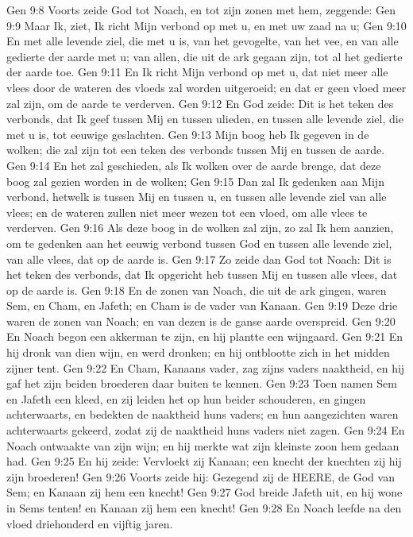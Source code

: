 Gen 9:8  Voorts zeide God tot Noach, en tot zijn zonen met hem, zeggende:
Gen 9:9  Maar Ik, ziet, Ik richt Mijn verbond op met u, en met uw zaad na u;
Gen 9:10  En met alle levende ziel, die met u is, van het gevogelte, van het vee, en van alle gedierte der aarde met u; van allen, die uit de ark gegaan zijn, tot al het gedierte der aarde toe.
Gen 9:11  En Ik richt Mijn verbond op met u, dat niet meer alle vlees door de wateren des vloeds zal worden uitgeroeid; en dat er geen vloed meer zal zijn, om de aarde te verderven.
Gen 9:12  En God zeide: Dit is het teken des verbonds, dat Ik geef tussen Mij en tussen ulieden, en tussen alle levende ziel, die met u is, tot eeuwige geslachten.
Gen 9:13  Mijn boog heb Ik gegeven in de wolken; die zal zijn tot een teken des verbonds tussen Mij en tussen de aarde.
Gen 9:14  En het zal geschieden, als Ik wolken over de aarde brenge, dat deze boog zal gezien worden in de wolken;
Gen 9:15  Dan zal Ik gedenken aan Mijn verbond, hetwelk is tussen Mij en tussen u, en tussen alle levende ziel van alle vlees; en de wateren zullen niet meer wezen tot een vloed, om alle vlees te verderven.
Gen 9:16  Als deze boog in de wolken zal zijn, zo zal Ik hem aanzien, om te gedenken aan het eeuwig verbond tussen God en tussen alle levende ziel, van alle vlees, dat op de aarde is.
Gen 9:17  Zo zeide dan God tot Noach: Dit is het teken des verbonds, dat Ik opgericht heb tussen Mij en tussen alle vlees, dat op de aarde is.
Gen 9:18  En de zonen van Noach, die uit de ark gingen, waren Sem, en Cham, en Jafeth; en Cham is de vader van Kanaan.
Gen 9:19  Deze drie waren de zonen van Noach; en van dezen is de ganse aarde overspreid.
Gen 9:20  En Noach begon een akkerman te zijn, en hij plantte een wijngaard.
Gen 9:21  En hij dronk van dien wijn, en werd dronken; en hij ontblootte zich in het midden zijner tent.
Gen 9:22  En Cham, Kanaans vader, zag zijns vaders naaktheid, en hij gaf het zijn beiden broederen daar buiten te kennen.
Gen 9:23  Toen namen Sem en Jafeth een kleed, en zij leiden het op hun beider schouderen, en gingen achterwaarts, en bedekten de naaktheid huns vaders; en hun aangezichten waren achterwaarts gekeerd, zodat zij de naaktheid huns vaders niet zagen.
Gen 9:24  En Noach ontwaakte van zijn wijn; en hij merkte wat zijn kleinste zoon hem gedaan had.
Gen 9:25  En hij zeide: Vervloekt zij Kanaan; een knecht der knechten zij hij zijn broederen!
Gen 9:26  Voorts zeide hij: Gezegend zij de HEERE, de God van Sem; en Kanaan zij hem een knecht!
Gen 9:27  God breide Jafeth uit, en hij wone in Sems tenten! en Kanaan zij hem een knecht!
Gen 9:28  En Noach leefde na den vloed driehonderd en vijftig jaren.
